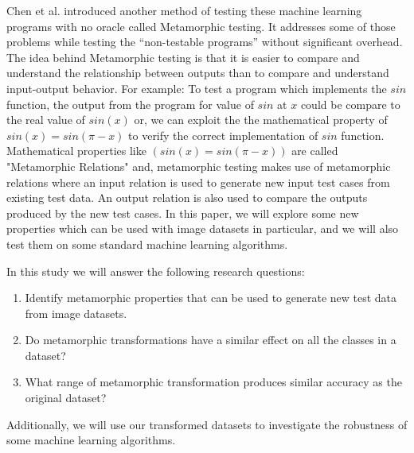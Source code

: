 Chen et al. introduced another method of testing these machine learning programs with no oracle called Metamorphic testing. It addresses some of those problems while testing the \enquote{non-testable programs} without significant overhead. The idea behind Metamorphic testing is that it is easier to compare and understand the relationship between outputs than to compare and understand input-output behavior. For example: To test a program which implements the $sin$ function, the output from the program for value of $sin$ at $x$ could be compare to the real value of $sin(x)$ or, we can exploit the the mathematical property of $sin(x) = sin(\pi-x)$ to verify the correct implementation of $sin$ function. Mathematical properties like $(sin(x) = sin(\pi-x))$ are called "Metamorphic Relations" and, metamorphic testing makes use of metamorphic relations where an input relation is used to generate new input test cases from existing test data. An output relation is also used to compare the outputs produced by the new test cases.
\newline
In this paper, we will explore some new properties which can be used with image datasets in particular, and we will also test them on some standard machine learning algorithms.


In this study we will answer the following research questions:
\begin{enumerate}
    \item Identify metamorphic properties that can be used to generate new test data from image datasets.
    \item Do metamorphic transformations have a similar effect on all the classes in a dataset?
    \item What range of metamorphic transformation produces similar accuracy as the original dataset?

\end{enumerate}
Additionally, we will use our transformed datasets to investigate the robustness of some machine learning algorithms.
%
